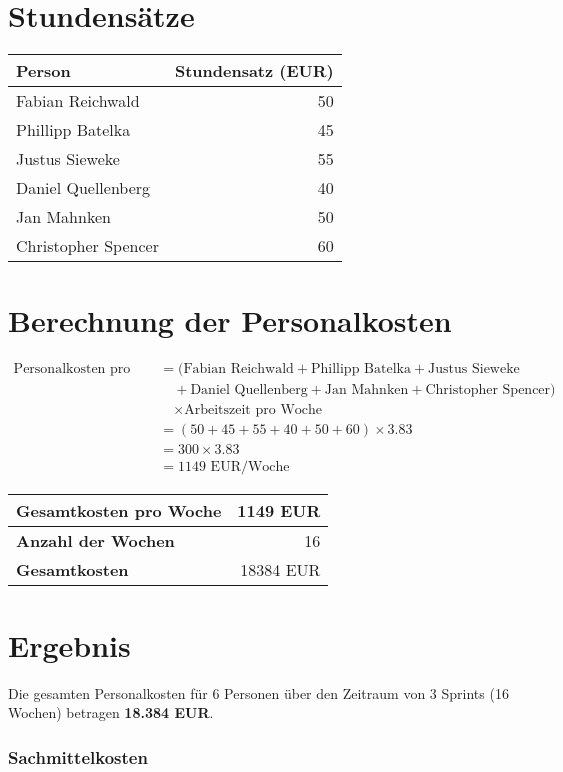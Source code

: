 \section*{Stundensätze}
\begin{tabular}{lr}
  \toprule
  \textbf{Person} & \textbf{Stundensatz (EUR)} \\
  \midrule
  Fabian Reichwald & 50 \\
  Phillipp Batelka & 45 \\
  Justus Sieweke & 55 \\
  Daniel Quellenberg & 40 \\
  Jan Mahnken & 50 \\
  Christopher Spencer & 60 \\
  \bottomrule
\end{tabular}

\section*{Berechnung der Personalkosten}
\[
  \begin{aligned}
    \text{Personalkosten pro Woche} &= (\text{Fabian Reichwald} + \text{Phillipp Batelka} + \text{Justus Sieweke} \\
    &\quad + \text{Daniel Quellenberg} + \text{Jan Mahnken} + \text{Christopher Spencer}) \\
    &\quad \times \text{Arbeitszeit pro Woche} \\
    &= (50 + 45 + 55 + 40 + 50 + 60) \times 3.83 \\
    &= 300 \times 3.83 \\
    &= 1149 \text{ EUR/Woche}
  \end{aligned}
\]

\begin{tabular}{lr}
  \toprule
  \textbf{Gesamtkosten pro Woche} & 1149 EUR \\
  \midrule
  \textbf{Anzahl der Wochen} & 16 \\
  \midrule
  \textbf{Gesamtkosten} & 18384 EUR \\
  \bottomrule
\end{tabular}

\section*{Ergebnis}
Die gesamten Personalkosten für 6 Personen über den Zeitraum von 3 Sprints (16 Wochen) betragen \textbf{18.384 EUR}.


\subsubsection{Sachmittelkosten}\label{sachmittelkosten}

